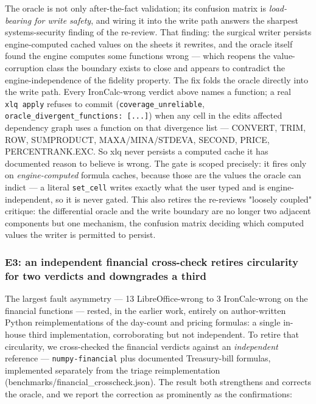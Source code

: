 \documentclass[
]{article}
\begin{document}
The oracle is not only after-the-fact validation; its confusion matrix
is \emph{load-bearing for write safety}, and wiring it into the write
path answers the sharpest systems-security finding of the re-review.
That finding: the surgical writer persists engine-computed cached values
on the sheets it rewrites, and the oracle itself found the engine
computes some functions wrong --- which reopens the value-corruption
class the boundary exists to close and appears to contradict the
engine-independence of the fidelity property. The fix folds the oracle
directly into the write path. Every IronCalc-wrong verdict above names a
function; a real \texttt{xlq\ apply} refuses to commit
(\texttt{coverage\_unreliable},
\texttt{oracle\_divergent\_functions:\ {[}...{]}}) when any cell in the
edit\textquotesingle s affected dependency graph uses a function on that
divergence list --- CONVERT, TRIM, ROW, SUMPRODUCT, MAXA/MINA/STDEVA,
SECOND, PRICE, PERCENTRANK.EXC. So xlq never persists a computed cache
it has documented reason to believe is wrong. The gate is scoped
precisely: it fires only on \emph{engine-computed} formula caches,
because those are the values the oracle can indict --- a literal
\texttt{set\_cell} writes exactly what the user typed and is
engine-independent, so it is never gated. This also retires the
re-review\textquotesingle s "loosely coupled" critique: the differential
oracle and the write boundary are no longer two adjacent components but
one mechanism, the confusion matrix deciding which computed values the
writer is permitted to persist.

\subsubsection{E3: an independent financial cross-check retires
circularity for two verdicts and downgrades a
third}\label{e3-an-independent-financial-cross-check-retires-circularity-for-two-verdicts-and-downgrades-a-third}

The largest fault asymmetry --- 13 LibreOffice-wrong to 3 IronCalc-wrong
on the financial functions --- rested, in the earlier work, entirely on
author-written Python reimplementations of the day-count and pricing
formulas: a single in-house third implementation, corroborating but not
independent. To retire that circularity, we cross-checked the financial
verdicts against an \emph{independent} reference ---
\texttt{numpy-financial} plus documented Treasury-bill formulas,
implemented separately from the triage reimplementation
(benchmarks/financial\_crosscheck.json). The result both strengthens and
corrects the oracle, and we report the correction as prominently as the
confirmations:
\end{document}

